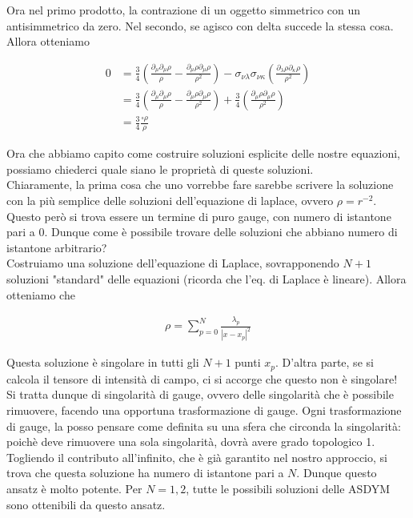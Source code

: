 \documentclass{report}
\begin{document}
Ora nel primo prodotto, la contrazione di un oggetto simmetrico con un antisimmetrico da zero. Nel secondo, se agisco con delta succede la stessa cosa. Allora otteniamo 

\begin{align}
    0 &= \frac{3}{4}\left(\frac{\partial_\mu \partial_\mu \rho}{\rho} - \frac{\partial_\mu\rho \partial_\mu \rho}{\rho^2} \right) -  \sigma_{\nu\lambda}\sigma_{\nu\kappa}\left(\frac{\partial_\lambda \rho \partial_\kappa \rho}{\rho^2}\right) \\
    &= \frac{3}{4}\left(\frac{\partial_\mu \partial_\mu \rho}{\rho} - \frac{\partial_\mu\rho \partial_\mu \rho}{\rho^2} \right) + \frac{3}{4}\left(\frac{\partial_\mu \rho \partial_\mu \rho}{\rho^2}\right) \\
    &= \frac{3}{4}\frac{\square \rho}{\rho}
\end{align}

Ora che abbiamo capito come costruire soluzioni esplicite delle nostre equazioni, possiamo chiederci quale siano le proprietà di queste soluzioni. \\

Chiaramente, la prima cosa che uno vorrebbe fare sarebbe scrivere la soluzione con la più semplice delle soluzioni dell'equazione di laplace, ovvero \(\rho = r^{-2}\). Questo però si trova essere un termine di puro gauge, con numero di istantone pari a 0. Dunque come è possibile trovare delle soluzioni che abbiano numero di istantone arbitrario? \\

Costruiamo una soluzione dell'equazione di Laplace, sovrapponendo \(N+1\) soluzioni "standard" delle equazioni (ricorda che l'eq. di Laplace è lineare). Allora otteniamo che 

\begin{align}
    \rho = \sum_{p=0}^N \frac{\lambda_p}{|x-x_p|^2}
\end{align}

Questa soluzione è singolare in tutti gli \(N+1\) punti \(x_p\). D'altra parte, se si calcola il tensore di intensità di campo, ci si accorge che questo non è singolare! Si tratta dunque di singolarità di gauge, ovvero delle singolarità che è possibile rimuovere, facendo una opportuna trasformazione di gauge. Ogni trasformazione di gauge, la posso pensare come definita su una sfera che circonda la singolarità: poichè deve rimuovere una sola singolarità, dovrà avere grado topologico 1. Togliendo il contributo all'infinito, che è già garantito nel nostro approccio, si trova che questa soluzione ha numero di istantone pari a \(N\). Dunque questo ansatz è molto potente. Per \(N=1, 2\), tutte le possibili soluzioni delle ASDYM sono ottenibili da questo ansatz. 
\end{document}
